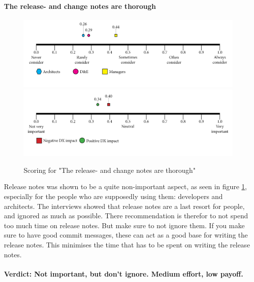 \documentclass{article}
\begin{document}
\paragraph{The release- and change notes are thorough}
\begin{figure}[H]
\centering
\includegraphics[width=\linewidth]{scorelines/aspect10.png}
\includegraphics[width=\linewidth]{dxscorelines/dxaspect10.png}
\caption{Scoring for "The release- and change notes are thorough"}
\label{fig:aspect10}
\end{figure}
Release notes was shown to be a quite non-important aspect, as seen in figure \ref{fig:aspect10}, especially for the people who are supposedly using them: developers and architects. The interviews showed that release notes are a last resort for people, and ignored as much as possible. There recommendation is therefor to not spend too much time on release notes. But make sure to not ignore them. If you make sure to have good commit messages, these can act as a good base for writing the release notes. This minimises the time that has to be spent on writing the release notes.\\ \\
\textbf{Verdict: Not important, but don't ignore. Medium effort, low payoff.}
\end{document}
